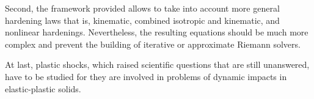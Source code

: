 Second, the framework provided allows to take into account more general hardening laws that is, kinematic, combined isotropic and kinematic, and nonlinear hardenings.
Nevertheless, the resulting equations should be much more complex and prevent the building of iterative or approximate Riemann solvers.

At last, plastic shocks, which raised scientific questions that are still unanswered, have to be studied for they are involved in problems of dynamic impacts in elastic-plastic solids.



